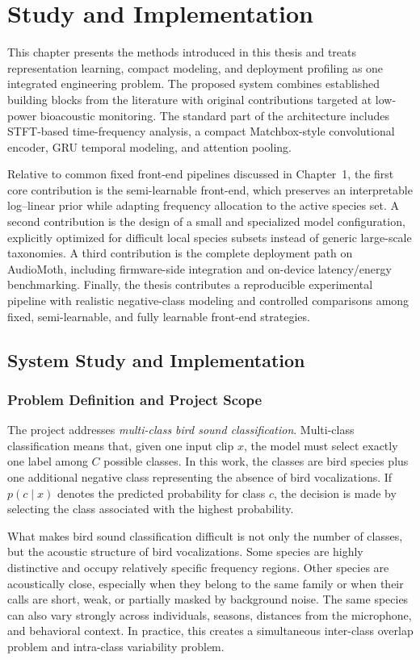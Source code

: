 \documentclass[a4paper,singleside,12pt]{report} %
\begin{document}
	\chapter{Study and Implementation}
	This chapter presents the methods introduced in this thesis and treats representation learning, compact modeling, and deployment profiling as one integrated engineering problem.
	The proposed system combines established building blocks from the literature with original contributions targeted at low-power bioacoustic monitoring. The standard part of the architecture includes STFT-based time-frequency analysis, a compact Matchbox-style convolutional encoder, GRU temporal modeling, and attention pooling.

	Relative to common fixed front-end pipelines discussed in Chapter~1, the first core contribution is the semi-learnable front-end, which preserves an interpretable log--linear prior while adapting frequency allocation to the active species set. A second contribution is the design of a small and specialized model configuration, explicitly optimized for difficult local species subsets instead of generic large-scale taxonomies. A third contribution is the complete deployment path on AudioMoth, including firmware-side integration and on-device latency/energy benchmarking. Finally, the thesis contributes a reproducible experimental pipeline with realistic negative-class modeling and controlled comparisons among fixed, semi-learnable, and fully learnable front-end strategies.
	\section{System Study and Implementation}
	\subsection{Problem Definition and Project Scope}
	The project addresses \emph{multi-class bird sound classification}. Multi-class classification means that, given one input clip \(x\), the model must select exactly one label among \(C\) possible classes. In this work, the classes are bird species plus one additional negative class representing the absence of bird vocalizations. If \(p(c \mid x)\) denotes the predicted probability for class \(c\), the decision is made by selecting the class associated with the highest probability.

	What makes bird sound classification difficult is not only the number of classes, but the acoustic structure of bird vocalizations. Some species are highly distinctive and occupy relatively specific frequency regions. Other species are acoustically close, especially when they belong to the same family or when their calls are short, weak, or partially masked by background noise. The same species can also vary strongly across individuals, seasons, distances from the microphone, and behavioral context. In practice, this creates a simultaneous inter-class overlap problem and intra-class variability problem.
\end{document}
